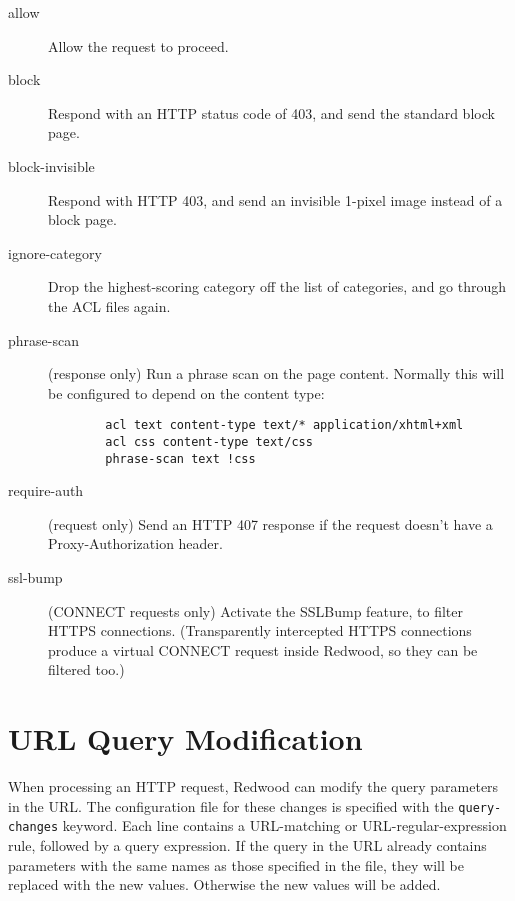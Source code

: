 \documentclass{article}
\begin{document}
\begin{description}

	\item[allow] Allow the request to proceed.

	\item[block] Respond with an HTTP status code of 403, and send the standard block page.

	\item[block-invisible] Respond with HTTP 403, and send an invisible 1-pixel image instead of a block page.

	\item[ignore-category] Drop the highest-scoring category off the list of categories,
		and go through the ACL files again.

	\item[phrase-scan] (response only) Run a phrase scan on the page content.
		Normally this will be configured to depend on the content type:

		\begin{verbatim}
		acl text content-type text/* application/xhtml+xml
		acl css content-type text/css
		phrase-scan text !css
		\end{verbatim}

	\item[require-auth] (request only) Send an HTTP 407 response if the request doesn't have a
		Proxy-Authorization header.

	\item[ssl-bump] (CONNECT requests only) Activate the SSLBump feature, to filter HTTPS connections.
		(Transparently intercepted HTTPS connections produce a virtual CONNECT request inside Redwood,
		so they can be filtered too.)

\end{description}

\section{URL Query Modification}

When processing an HTTP request, Redwood can modify the query parameters in the URL.
The configuration file for these changes is specified with the \verb"query-changes" keyword.
Each line contains a URL-matching or URL-regular-expression rule, 
followed by a query expression.
If the query in the URL already contains parameters with the same names as those specified in the file,
they will be replaced with the new values. Otherwise the new values will be added.
\end{document}
